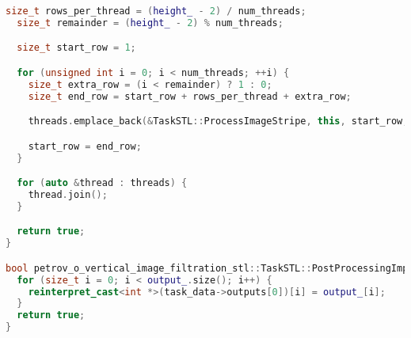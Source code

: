 \documentclass[12pt,a4paper]{extarticle}
\begin{document}
\begin{lstlisting}[language=C++]
  size_t rows_per_thread = (height_ - 2) / num_threads;
  size_t remainder = (height_ - 2) % num_threads;

  size_t start_row = 1;

  for (unsigned int i = 0; i < num_threads; ++i) {
    size_t extra_row = (i < remainder) ? 1 : 0;
    size_t end_row = start_row + rows_per_thread + extra_row;

    threads.emplace_back(&TaskSTL::ProcessImageStripe, this, start_row, end_row);

    start_row = end_row;
  }

  for (auto &thread : threads) {
    thread.join();
  }

  return true;
}

bool petrov_o_vertical_image_filtration_stl::TaskSTL::PostProcessingImpl() {
  for (size_t i = 0; i < output_.size(); i++) {
    reinterpret_cast<int *>(task_data->outputs[0])[i] = output_[i];
  }
  return true;
}
\end{lstlisting}
\end{document}
